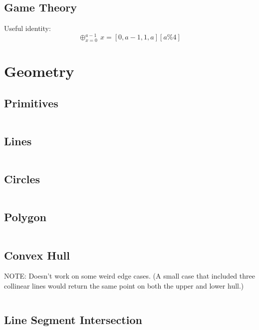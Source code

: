 \documentclass[8pt,a4paper,landscape,oneside]{amsart}
\newcommand{\code}[1]{\inputminted[fontsize=\normalsize,baselinestretch=1]{cpp}{_code/#1}}
\newif\ifverbose
\begin{document}
\begin{multicols*}{3}
    \subsection{Game Theory}
        Useful identity: \[
            \oplus_{x=0}^{a-1}\, x = [0,a-1,1,a][a\% 4]
            \]

\section{Geometry}
    \subsection{Primitives}
        \ifverbose
        Geometry primitives.
        \fi
        \code{geometry/primitives.cpp}
    \subsection{Lines}
        \ifverbose
        Line related functions.
        \fi
        \code{geometry/lines.cpp}
    \subsection{Circles}
        \ifverbose
        Circle related functions.
        \fi
        \code{geometry/circles.cpp}

    \subsection{Polygon}
        \ifverbose
        Polygon primitives.
        \fi
        \code{geometry/polygon.cpp}

    \subsection{Convex Hull}
        \ifverbose
        An algorithm that finds the Convex Hull of a set of points.
        \fi
        NOTE: Doesn't work on some weird edge cases. (A small case that
        included three collinear lines would return the same point on both the
        upper and lower hull.)
        \code{geometry/convex_hull.cpp}

    \subsection{Line Segment Intersection}
        \ifverbose
        Computes the intersection between two line segments.
        \fi
        \code{geometry/line_segment_intersect.cpp}


\end{multicols*}
\end{document}
